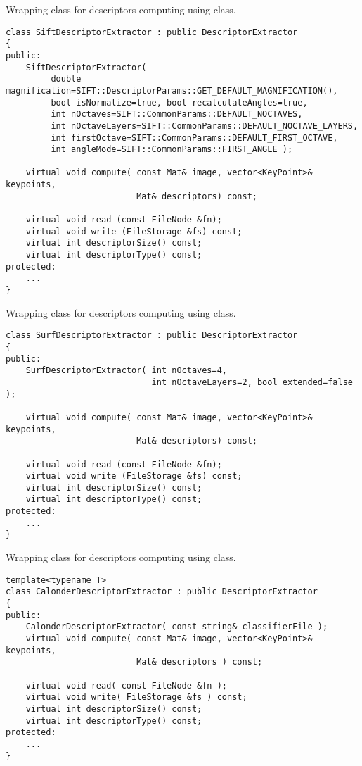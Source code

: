 Wrapping class for descriptors computing using  class.

\begin{lstlisting}
class SiftDescriptorExtractor : public DescriptorExtractor
{
public:
    SiftDescriptorExtractor( 
	     double magnification=SIFT::DescriptorParams::GET_DEFAULT_MAGNIFICATION(),
	     bool isNormalize=true, bool recalculateAngles=true,
	     int nOctaves=SIFT::CommonParams::DEFAULT_NOCTAVES,
	     int nOctaveLayers=SIFT::CommonParams::DEFAULT_NOCTAVE_LAYERS,
	     int firstOctave=SIFT::CommonParams::DEFAULT_FIRST_OCTAVE,
	     int angleMode=SIFT::CommonParams::FIRST_ANGLE );

    virtual void compute( const Mat& image, vector<KeyPoint>& keypoints, 
                          Mat& descriptors) const;

    virtual void read (const FileNode &fn);
    virtual void write (FileStorage &fs) const;
    virtual int descriptorSize() const;
    virtual int descriptorType() const;
protected:
    ...
}
\end{lstlisting}

Wrapping class for descriptors computing using  class.

\begin{lstlisting}
class SurfDescriptorExtractor : public DescriptorExtractor
{
public:
    SurfDescriptorExtractor( int nOctaves=4,
                             int nOctaveLayers=2, bool extended=false );

    virtual void compute( const Mat& image, vector<KeyPoint>& keypoints, 
                          Mat& descriptors) const;

    virtual void read (const FileNode &fn);
    virtual void write (FileStorage &fs) const;
    virtual int descriptorSize() const;
    virtual int descriptorType() const;
protected:
    ...
}
\end{lstlisting}

Wrapping class for descriptors computing using  class.

\begin{lstlisting}
template<typename T>
class CalonderDescriptorExtractor : public DescriptorExtractor
{
public:
    CalonderDescriptorExtractor( const string& classifierFile );
    virtual void compute( const Mat& image, vector<KeyPoint>& keypoints, 
                          Mat& descriptors ) const;
    
    virtual void read( const FileNode &fn );
    virtual void write( FileStorage &fs ) const;
    virtual int descriptorSize() const;
    virtual int descriptorType() const;
protected:
    ...
}
\end{lstlisting}

